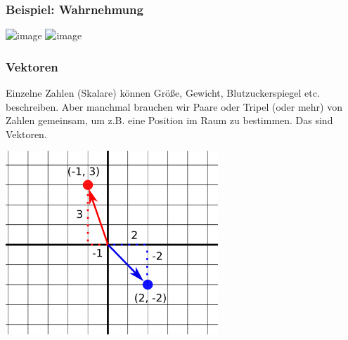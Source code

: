 \documentclass{beamer}
\begin{document}
\begin{frame}
\begin{columns}[c]
\begin{column}{5cm}
    
\end{column}
    
\end{columns}

\begin{center}
    
\end{center}




\end{frame}


\begin{frame}

\frametitle{Beispiel: Wahrnehmung}

\begin{center}
    \includegraphics<1>[width=0.8\textwidth]{weber_fechner.png}
    \includegraphics<2>[width=0.8\textwidth]{weber_fechner_log_scale.png}

\end{center}

\end{frame}


\begin{frame}
\frametitle{Vektoren}

Einzelne Zahlen (Skalare) können Größe, Gewicht, Blutzuckerspiegel etc. beschreiben.  Aber manchmal brauchen wir Paare oder Tripel (oder mehr) von Zahlen gemeinsam, um z.B. eine Position im Raum zu bestimmen. Das sind Vektoren. \\

\begin{center}
\includegraphics[width=0.6\textwidth]{vectors.png}
\end{center}



\end{frame}
\end{document}
